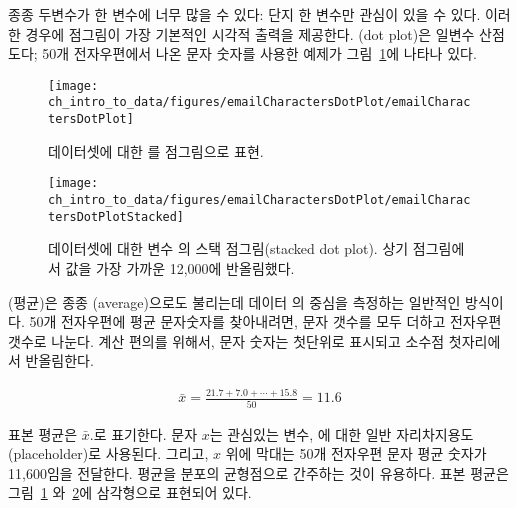 종종 두변수가 한 변수에 너무 많을 수 있다: 단지 한 변수만 관심이 있을 수 있다.
이러한 경우에 점그림이 가장 기본적인 시각적 출력을 제공한다. (dot plot)은 일변수 산점도다;
50개 전자우편에서 나온 문자 숫자를 사용한 예제가 그림~\ref{emailCharactersDotPlot}에 나타나 있다.

\begin{figure}[h]
   \centering
   \texttt{[image: ch\_intro\_to\_data/figures/emailCharactersDotPlot/emailCharactersDotPlot]}
   \caption{ 데이터셋에 대한 를 점그림으로 표현.}
   \label{emailCharactersDotPlot}
\end{figure}

\begin{figure}[h]
   \centering
   \texttt{[image: ch\_intro\_to\_data/figures/emailCharactersDotPlot/emailCharactersDotPlotStacked]}
   \caption{ 데이터셋에 대한 변수 의 스택 점그림(stacked dot plot).
   상기 점그림에서 값을 가장 가까운 12,000에 반올림했다.}
   \label{emailCharactersDotPlotStacked}
\end{figure}

(평균)은 종종 (average)으로도 불리는데 데이터 의 중심을 측정하는 일반적인 방식이다. 50개 전자우편에 평균 문자숫자를 찾아내려면, 문자 갯수를 모두 더하고 전자우편 갯수로 나눈다.
계산 편의를 위해서, 문자 숫자는 첫단위로 표시되고 소수점 첫자리에서 반올림한다.

\begin{eqnarray}
\bar{x} = \frac{21.7 + 7.0 + \cdots + 15.8}{50} = 11.6
\label{sampleMeanEquation}
\end{eqnarray}

표본 평균은 $\bar{x}$.로 표기한다. 문자 $x$는 관심있는 변수, 에 대한 일반 자리차지용도(placeholder)로 사용된다.
그리고, $x$ 위에 막대는 50개 전자우편 문자 평균 숫자가 11,600임을 전달한다.
평균을 분포의 균형점으로 간주하는 것이 유용하다. 표본 평균은 그림~\ref{emailCharactersDotPlot} 와~\ref{emailCharactersDotPlotStacked}에 삼각형으로 표현되어 있다.


